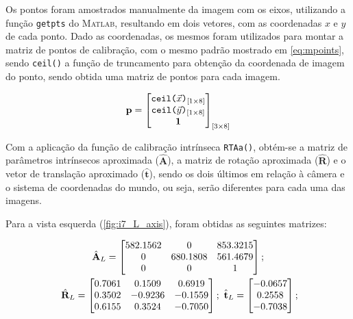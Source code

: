 Os pontos foram amostrados manualmente da imagem com os eixos, utilizando a função \texttt{getpts} do \textsc{Matlab}, resultando em dois vetores, com as coordenadas $x$ e $y$ de cada ponto. Dado as coordenadas, os mesmos foram utilizados para montar a matriz de pontos de calibração, com o mesmo padrão mostrado em \eqref{eq:mpoints}, sendo \texttt{ceil()} a função de truncamento para obtenção da coordenada de imagem do ponto, sendo obtida uma matriz de pontos para cada imagem.

\begin{equation}\label{eq:mpoints}
	\mathbf{p} = \begin{bmatrix}
		\texttt{ceil(}\vec{x}\texttt{)}_{[1 \times 8]} \\
		\texttt{ceil(}\vec{y}\texttt{)}_{[1 \times 8]} \\
		\mathbf{1}
	\end{bmatrix}_{[3 \times 8]}
\end{equation}

Com a aplicação da função de calibração intrínseca \texttt{RTAa()}, obtém-se a matriz de parâmetros intrínsecos aproximada ($\mathbf{\hat{A}}$), a matriz de rotação aproximada ($\mathbf{\hat{R}}$) e o vetor de translação aproximado ($\mathbf{\hat{t}}$), sendo os dois últimos em relação à câmera e o sistema de coordenadas do mundo, ou seja, serão diferentes para cada uma das imagens.

Para a vista esquerda (\autoref{fig:i7_L_axis}), foram obtidas as seguintes matrizes:

\begin{gather}\label{eq:ve}
\hat{\mathbf{A}}_L = \begin{bmatrix}
	582.1562 & 0        & 853.3215 \\
	0        & 680.1808 & 561.4679 \\
	0        & 0        & 1  
\end{bmatrix}; \\ \ \hat{\mathbf{R}}_L = \begin{bmatrix}
	0.7061  &  0.1509  &  0.6919 \\
	0.3502  & -0.9236  & -0.1559 \\
	0.6155  &  0.3524  & -0.7050
\end{bmatrix}; \ \hat{\mathbf{t}}_L = \begin{bmatrix}
	-0.0657 \\
	 0.2558 \\
	-0.7038
\end{bmatrix};  \label{eq:rtL}
\end{gather}

